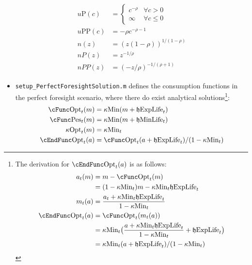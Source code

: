 \documentclass[titlepage,abstract]{\econtex}
\providecommand{\kappaMin}{\kappa\text{Min}}
\providecommand{\cFuncOpt}{\cFunc\text{Opt}}
\providecommand{\cFuncPes}{\cFunc\text{Pes}}
\providecommand{\cEndFuncOpt}{\cEndFunc\text{Opt}}
\providecommand{\kappaOpt}{\kappa\text{Opt}}
\providecommand{\hEndExpLife}{\mathfrak{h}\text{ExpLife}}
\providecommand{\hEndMinLife}{\mathfrak{h}\text{MinLife}}
\providecommand{\uP}{u\text{P}}
\providecommand{\uPP}{u\text{PP}}
\begin{document}
\begin{itemize}
\begin{equation}
\begin{gathered}
\begin{aligned}
      \uP(c)  & = 
      \begin{cases}
      c^{-\rho} & \forall c>0 \\
      \infty & \forall c \leq 0
      \end{cases} \\
      \uPP(c)  & =  -\rho c^{-\rho-1} \\
      n(z)  & =  (z(1-\rho))^{1/(1-\rho)} \\
      nP(z)  & =  z^{-1/\rho} \\
      nPP(z)  & =  (-z/\rho)^{-1/(\rho+1)}
      \end{aligned}\end{gathered}\end{equation}
      \item \texttt{setup\_PerfectForesightSolution.m} defines the consumption functions in the perfect foresight scenario, where there do exist analytical solutions\footnote{
          The derivation for $\cEndFuncOpt_{t}(a)$ is as follows:
          \begin{equation}\begin{gathered}\begin{aligned}
          a_{t}(m)  & =  m-\cFuncOpt_{t}(m) \\
           & =  (1-\kappaMin_{t}) m -\kappaMin_{t} \hEndExpLife_{t} \\
          m_{t} (a)  & =  \frac{a_{t}+ \kappaMin_{t}\hEndExpLife_{t}}{1-\kappaMin_{t}} \\
          \cEndFuncOpt_{t} (a)  & =  \cFuncOpt_{t}(m_{t}(a)) \\
           & =  \kappaMin_{t} \big(\frac{a+ \kappaMin_{t}\hEndExpLife_{t}}{1-\kappaMin_{t}} + \hEndExpLife_{t}\big) \\
           & =  \kappaMin_{t} (a+ \hEndExpLife_{t})/(1-\kappaMin_{t})
          \end{aligned}\end{gathered}\end{equation}
          }:
          \begin{equation}\begin{gathered}\begin{aligned}
          \cFuncOpt_{t}(m)  & =  \kappaMin (m+\hEndExpLife_{t}) \\
          \cFuncPes_{t}(m)  & =  \kappaMin (m+\hEndMinLife_{t}) \\
          \kappaOpt_{t}(m)  & =  \kappaMin_{t} \\
          \cEndFuncOpt_{t}(a)  & =  \cFuncOpt_{t}(a+\hEndExpLife_{t})/(1-\kappaMin_{t}) \\

\end{aligned}
\end{gathered}
\end{equation}
\end{itemize}
\end{document}
